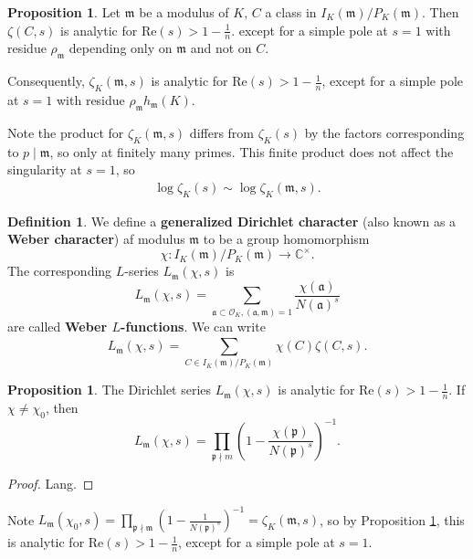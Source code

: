\documentclass{article}
\theoremstyle{definition}
\newtheorem{prop}[theorem]{Proposition}
\newtheorem{defn}[theorem]{Definition}
\begin{document}
\begin{prop}\label{prop2.41}
    Let $\mathfrak{m}$ be a modulus of $K$, $C$ a class in $I_K(\mathfrak{m})/P_K(\mathfrak{m})$. Then $\zeta(C,s)$ is analytic for $\text{Re}(s)>1-\frac{1}{n}$. except for a simple pole at $s=1$ with residue $\rho_{\mathfrak{m}}$ depending only on $\mathfrak{m}$ and not on $C$.
    \vspace{1mm}
     
    Consequently, $\zeta_K(\mathfrak{m},s)$ is analytic for $\text{Re}(s)>1-\frac{1}{n}$, except for a simple pole at $s=1$ with residue $\rho_{\mathfrak{m}}h_{\mathfrak{m}}(K)$. 
\end{prop}
Note the product for $\zeta_K(\mathfrak{m},s)$ differs from $\zeta_K(s)$ by the factors corresponding to $p \mid \mathfrak{m}$, so only at finitely many primes. This finite product does not affect the singularity at $s=1$, so 
\begin{align*}
    \log \zeta_K(s) \sim \log \zeta_K(\mathfrak{m},s).
\end{align*} 
\begin{defn}\label{defn2.42}
    We define a \textbf{generalized Dirichlet character} (also known as a \textbf{Weber character}) af modulus $\mathfrak{m}$ to be a group homomorphism
    \[
    \chi: I_K(\mathfrak{m})/P_K(\mathfrak{m}) \to \mathbb{C}^\times.
    \]
    The corresponding $L$-series $L_\mathfrak{m}(\chi,s)$ is 
    \[
    L_{\mathfrak{m}}(\chi,s) = \sum_{\mathfrak{a} \subset \mathcal{O}_K, (\mathfrak{a},\mathfrak{m})=1}^{} \frac{\chi(\mathfrak{a})}{N(\mathfrak{a})^s}
    \]
    are called \textbf{Weber $L$-functions}. We can write
    \[
    L_{\mathfrak{m}}(\chi,s) = \sum_{C \in I_K(\mathfrak{m})/P_K(\mathfrak{m})}^{} \chi(C) \zeta(C,s). 
    \]
\end{defn}
\begin{prop}\label{prop2.43}
    The Dirichlet series $L_{\mathfrak{m}}(\chi,s)$ is analytic for $\text{Re}(s)>1-\frac{1}{n}$. If $\chi \neq \chi_0$, then 
    \[
        L_{\mathfrak{m}}(\chi,s) = \prod_{\mathfrak{p} \nmid m}^{} \left(1-\frac{\chi(\mathfrak{p})}{N(\mathfrak{p})^s}\right)^{-1}.
    \]
\end{prop}
\begin{proof}
    Lang.
\end{proof}
Note $L_{\mathfrak{m}}(\chi_0,s) = \prod_{\mathfrak{p}\nmid \mathfrak{m}}^{} \left(1-\frac{1}{N(\mathfrak{p})^{s}}\right)^{-1} = \zeta_K(\mathfrak{m},s)$, so by Proposition \ref{prop2.41}, this is analytic for $\text{Re}(s)>1-\frac{1}{n}$, except for a simple pole at $s=1$.
\vspace{1mm}
 
\end{document}
